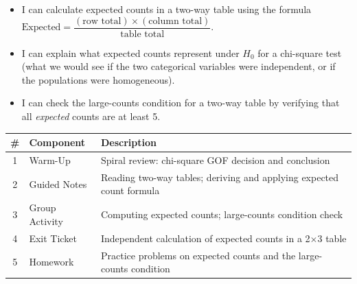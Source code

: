 \documentclass[10pt]{article}
\begin{document}

\vspace{2.4cm}
\namedateperiod

\begin{learningtargetbox}
\begin{itemize}
    \item I can calculate expected counts in a two-way table using the formula
          $\text{Expected} = \dfrac{(\text{row total}) \times (\text{column total})}{\text{table total}}$.
    \item I can explain what expected counts represent under $H_0$ for a chi-square test
          (what we would see if the two categorical variables were independent, or if the
          populations were homogeneous).
    \item I can check the large-counts condition for a two-way table by verifying that
          all \emph{expected} counts are at least 5.
\end{itemize}
\end{learningtargetbox}

\begin{tocbox}
\renewcommand{\arraystretch}{1.5}
\begin{tabularx}{\linewidth}{clX}
    \textbf{\#} & \textbf{Component} & \textbf{Description} \\
    \hline
    1 & Warm-Up        & Spiral review: chi-square GOF decision and conclusion \\
    2 & Guided Notes   & Reading two-way tables; deriving and applying expected count formula \\
    3 & Group Activity & Computing expected counts; large-counts condition check \\
    4 & Exit Ticket    & Independent calculation of expected counts in a 2$\times$3 table \\
    5 & Homework       & Practice problems on expected counts and the large-counts condition \\
\end{tabularx}
\end{tocbox}
\end{document}
